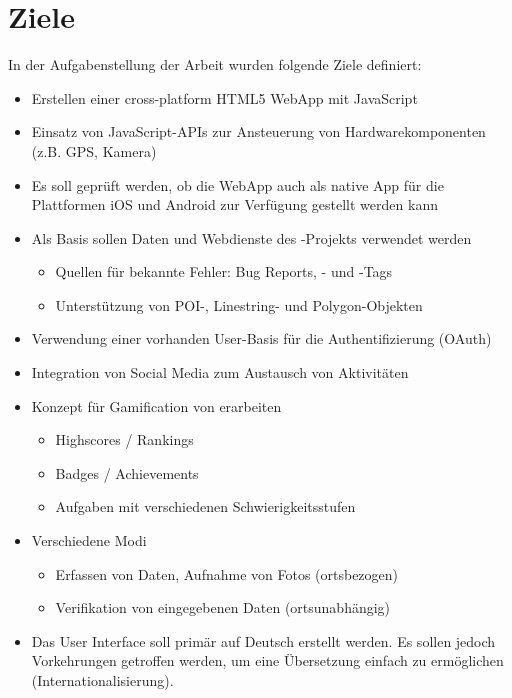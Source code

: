 \section{Ziele}
In der Aufgabenstellung der Arbeit wurden folgende Ziele definiert:
\begin{itemize}
	\item Erstellen einer cross-platform HTML5 \gls{WebApp} mit JavaScript
	\item Einsatz von JavaScript-\glspl{API} zur Ansteuerung von Hardwarekomponenten (z.B. GPS, Kamera)
	\item Es soll geprüft werden, ob die \gls{WebApp} auch als native App für die Plattformen iOS und Android zur Verfügung gestellt werden kann 
	\item Als Basis sollen Daten und Webdienste des -Projekts verwendet werden
	\begin{itemize}
		\item Quellen für bekannte Fehler:  Bug Reports, - und -\glspl{Tag}
		\item Unterstützung von \gls{POI}-, Linestring- und Polygon-Objekten
	\end{itemize}
	\item Verwendung einer vorhanden User-Basis für die Authentifizierung (\gls{OAuth})
	\item Integration von Social Media zum Austausch von Aktivitäten
	\item Konzept für Gamification von  erarbeiten
	\begin{itemize}
		\item Highscores / Rankings
		\item Badges / Achievements
		\item Aufgaben mit verschiedenen Schwierigkeitsstufen
	\end{itemize}
	\item Verschiedene Modi
	\begin{itemize}
		\item Erfassen von Daten, Aufnahme von Fotos (ortsbezogen)
		\item Verifikation von eingegebenen Daten (ortsunabhängig)
	\end{itemize}
	\item Das User Interface soll primär auf Deutsch erstellt werden. Es sollen jedoch Vorkehrungen getroffen werden, um eine Übersetzung einfach zu ermöglichen (Internationalisierung).
\end{itemize}

